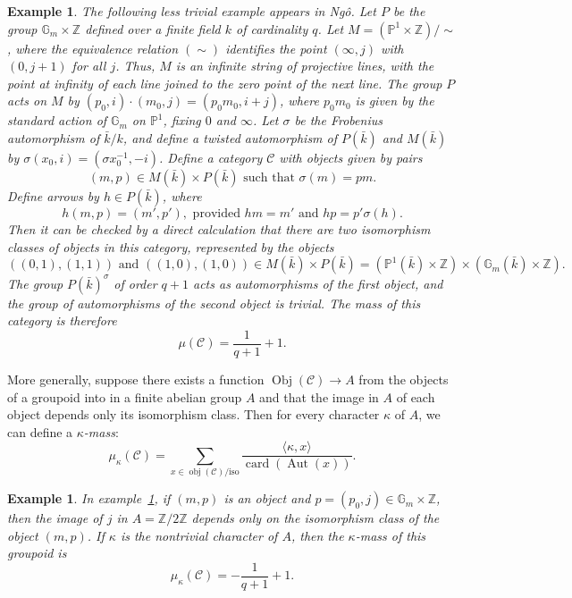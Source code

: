 \documentclass[brochure,english,12pt]{bourbaki}
\theoremstyle{plain}
\newtheorem{example}[equation]{Example}
\def\op#1{{\operatorname{#1}}}
\newcommand{\ring}[1]{\mathbb{#1}}
\def\C{{\mathcal C}}
\begin{document}
\begin{example}\label{ex:groupoid}
  The following less trivial example appears in Ng\^o.  Let $P$ be the
  group $\ring{G}_m\times \ring{Z}$ defined over a finite field $k$ of
  cardinality $q$.  Let $M = (\ring{P}^1\times\ring{Z})/\sim$, where
  the equivalence relation $(\sim)$ identifies the point $(\infty,j)$ with
  $(0,j+1)$ for all $j$.  Thus, $M$ is an infinite string of
  projective lines, with the point at infinity of each line joined to
  the zero point of the next line.  The group $P$ acts on $M$ by
  $(p_0,i)\cdot (m_0,j) = (p_0 m_0,i+j)$, where $p_0m_0$ is given by
  the standard action of $\ring{G}_m$ on $\ring{P}^1$, fixing $0$ and
  $\infty$.  Let $\sigma$ be the Frobenius automorphism of $\bar k/k$,
  and define a twisted automorphism of $P(\bar k)$ and $M(\bar k)$ by
  $\sigma(x_0,i) = (\sigma x_0^{-1},-i)$.  Define a category $\mathcal
  C$ with objects given by pairs
\begin{equation}\label{eqn:objects}
(m,p)\in M(\bar k)\times P(\bar k) \text{ such that } \sigma(m) = p
m.
\end{equation}
Define  arrows by $h\in P(\bar k)$, where
\begin{equation}\label{eqn:arrows}
h(m,p) = (m',p'),    \text{ provided } hm = m' \text{ and } h p = p'\sigma(h).
\end{equation}  
Then it can be checked by a direct
calculation that there are two isomorphism classes of objects in this
category, represented by the objects
\[
((0,1),(1,1))\text{ and }  ((1,0),(1,0))\in M(\bar k)\times P(\bar k) = 
(\ring{P}^1(\bar k)\times\ring{Z}) \times (\ring{G}_m(\bar k)\times\ring{Z}).
\]
The group $P(\bar k)^\sigma$ of order $q+1$ acts as automorphisms of the first object,
and the group of automorphisms of the second object is trivial.  The mass of this category
is therefore
\[
\mu(\C) = \frac{1}{q+1} + 1.
\]
\end{example}

More generally, suppose there exists a function $\op{Obj}(\C)\to  A$ from the objects
of a groupoid into in a finite abelian group $A$ and that the image in $A$ of each object
depends only its isomorphism class.  Then for every
character $\kappa$ of $A$, we can define a {\it $\kappa$-mass}:
\[
\mu_\kappa(\C)= \sum_{x\in \op{obj}(\C)/\text{iso}} 
\frac{\langle\kappa,x\rangle}{\op{card}(\op{Aut}(x))}.
\]

\begin{example}
  In  example~\ref{ex:groupoid}, if $(m,p)$ is an object and
  $p=(p_0,j)\in \ring{G}_m\times\ring{Z}$, then the image of $j$ in
  $A=\ring{Z}/2\ring{Z}$ depends only on the isomorphism class of the
  object $(m,p)$.  If $\kappa$ is the nontrivial character of $A$,
  then the $\kappa$-mass of this groupoid is
\[
\mu_\kappa(\C) = -\frac{1}{q+1} + 1.
\]
\end{example}
\end{document}
